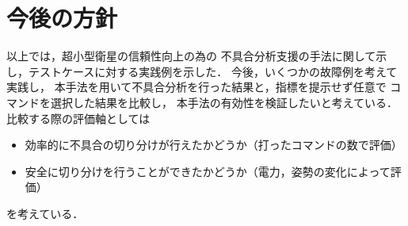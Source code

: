 \documentclass[11pt]{article}
\begin{document}
\section{今後の方針}
以上では，超小型衛星の信頼性向上の為の
不具合分析支援の手法に関して示し，テストケースに対する実践例を示した．
今後，いくつかの故障例を考えて実践し，
本手法を用いて不具合分析を行った結果と，指標を提示せず任意で
コマンドを選択した結果を比較し，
本手法の有効性を検証したいと考えている．
比較する際の評価軸としては
\begin{itemize}
   \item 効率的に不具合の切り分けが行えたかどうか（打ったコマンドの数で評価）
   \item 安全に切り分けを行うことができたかどうか（電力，姿勢の変化によって評価）
\end{itemize}
を考えている．

 
\end{document}
